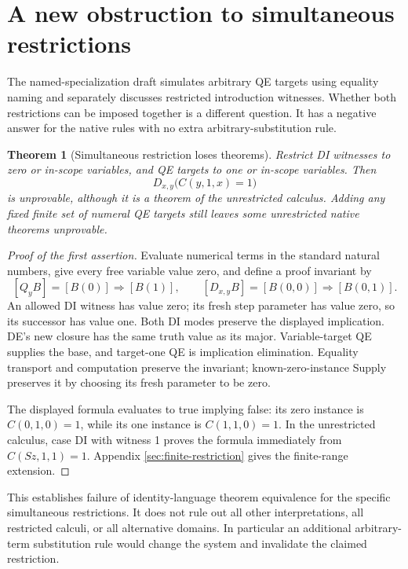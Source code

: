 \documentclass[11pt,letterpaper]{article}
\newtheorem{theorem}{Theorem}[section]
\theoremstyle{definition}\newtheorem{definition}[theorem]{Definition}
\theoremstyle{remark}\newtheorem{remark}[theorem]{Remark}
\begin{document}
\section{A new obstruction to simultaneous restrictions}
\label{sec:obstruction-summary}

The named-specialization draft simulates arbitrary QE targets using
equality naming and separately discusses restricted introduction
witnesses. Whether both restrictions can be imposed together is a
different question\cite{named}. It has a negative answer for the native
rules with no extra arbitrary-substitution rule.

\begin{theorem}[Simultaneous restriction loses theorems]
Restrict DI witnesses to zero or in-scope variables, and QE targets to
one or in-scope variables. Then
\[
                 D_{x,y}\bigl(C(y,1,x)=1\bigr)
\]
is unprovable, although it is a theorem of the unrestricted calculus.
Adding any fixed finite set of numeral QE targets still leaves some
unrestricted native theorems unprovable.
\end{theorem}
\begin{proof}[Proof of the first assertion]
Evaluate numerical terms in the standard natural numbers, give every
free variable value zero, and define a proof invariant by
\[
 [Q_yB]=[B(0)]\Rightarrow[B(1)],\qquad
 [D_{x,y}B]=[B(0,0)]\Rightarrow[B(0,1)].
\]
An allowed DI witness has value zero; its fresh step parameter has value
zero, so its successor has value one. Both DI modes preserve the
displayed implication. DE's new closure has the same truth value as
its major. Variable-target QE supplies the base, and target-one QE is
implication elimination. Equality transport and computation preserve
the invariant; known-zero-instance Supply preserves it by choosing its
fresh parameter to be zero.

The displayed formula evaluates to true implying false: its zero
instance is $C(0,1,0)=1$, while its one instance is $C(1,1,0)=1$.
In the unrestricted calculus, case DI with witness 1 proves the formula
immediately from $C(Sz,1,1)=1$. Appendix
\ref{sec:finite-restriction} gives the finite-range extension.
\end{proof}

This establishes failure of identity-language theorem equivalence for
the specific simultaneous restrictions. It does not rule out all other
interpretations, all restricted calculi, or all alternative domains. In
particular an additional arbitrary-term substitution rule would change
the system and invalidate the claimed restriction.
\end{document}
